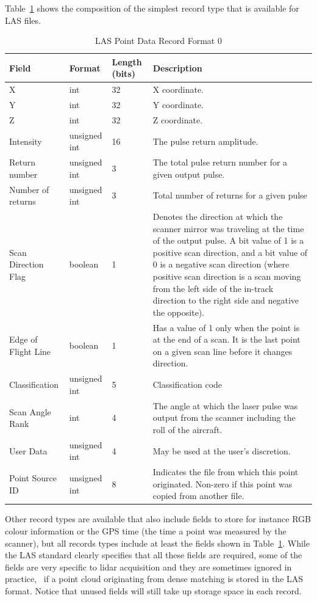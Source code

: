 Table~\ref{tab:las-record} shows the composition of the simplest record type that is available for LAS files.
\begin{table}
  \centering
  \small
  \begin{tabular}{l|l|l|p{7cm}}
    Field & Format & Length (bits) & Description\\ \midrule
    X & int & 32 & X coordinate. \\ 
    Y & int & 32 & Y coordinate. \\ 
    Z & int & 32 & Z coordinate. \\ 
    Intensity & unsigned int & 16 & The pulse return amplitude. \\ 
    Return number & unsigned int & 3 &  The total pulse return number for a given output pulse. \\ 
    Number of returns & unsigned int & 3 & Total number of returns for a given pulse \\ 
    Scan Direction Flag & boolean & 1 & Denotes the direction at which the scanner mirror was traveling at the time of the output pulse. A bit value of 1 is a positive scan direction, and a bit value of 0 is a negative scan direction (where positive scan direction is a scan moving from the left side of the in-track direction to the right side and negative the opposite).  \\ 
    Edge of Flight Line & boolean & 1 & Has a value of 1 only when the point is at the end of a scan. It is the last point on a given scan line before it changes direction. \\ 
    Classification & unsigned int & 5 & Classification code \\ 
    Scan Angle Rank & int & 4 & The angle at which the laser pulse was output from the scanner including the roll of the aircraft. \\ 
    User Data & unsigned int & 4 & May be used at the user's discretion. \\ 
    Point Source ID & unsigned int & 8 & Indicates the file from which this point originated. Non-zero if this point was copied from another file.
  \end{tabular}
\caption{LAS Point Data Record Format 0}%
\label{tab:las-record}
\end{table}
Other record types are available that also include fields to store for instance  RGB colour information or the GPS time (the time a point was measured by the scanner), but all records types include at least the fields shown in Table~\ref{tab:las-record}.
While the LAS standard clearly specifies that all these fields are required, some of the fields are very specific to lidar acquisition and they are sometimes ignored in practice, \eg\ if a point cloud originating from dense matching is stored in the LAS format. 
Notice that unused fields will still take up storage space in each record.

